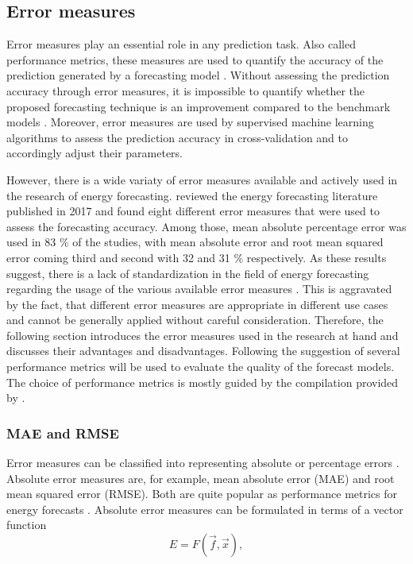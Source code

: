 
\subsection{Error measures} \label{Sec:Method;Subsec:Error}

Error measures play an essential role in any prediction task. Also called performance metrics, these measures are used to quantify the accuracy of the prediction generated by a forecasting model \citep{zor:2017}. Without assessing the prediction accuracy through error measures, it is impossible to quantify whether the proposed forecasting technique is an improvement compared to the benchmark models \citep{Meer:2018}. Moreover, error measures are used by supervised machine learning algorithms to assess the prediction accuracy in cross-validation and to accordingly adjust their parameters.

However, there is a wide variaty of error measures available and actively used in the research of energy forecasting. \citet{zor:2017} reviewed the energy forecasting literature published in 2017 and found eight different error measures that were used to assess the forecasting accuracy. Among those, mean absolute percentage error was used in 83 \% of the studies, with mean absolute error and root mean squared error coming third and second with 32 and 31 \% respectively. As these results suggest, there is a lack of standardization in the field of energy forecasting regarding the usage of the various available error measures \citep{Meer:2018}. This is aggravated by the fact, that different error measures are appropriate in different use cases and cannot be generally applied without careful consideration. Therefore, the following section introduces the error measures used in the research at hand and discusses their advantages and disadvantages. Following the suggestion of \citet{Hoff:2013} several performance metrics will be used to evaluate the quality of the forecast models. The choice of performance metrics is mostly guided by the compilation provided by \citet{Meer:2018}.


\subsubsection{MAE and RMSE}

Error measures can be classified into representing absolute or percentage errors \citep{Hoff:2013}. Absolute error measures are, for example, mean absolute error (MAE) and root mean squared error (RMSE). Both are quite popular as performance metrics for energy forecasts \citep{zor:2017}. Absolute error measures can be formulated in terms of a vector function 
%
\begin{equation} \label{Eq:vectorfunction}
    E=F\left(\vec{f}, \vec{x}\right),
\end{equation}

